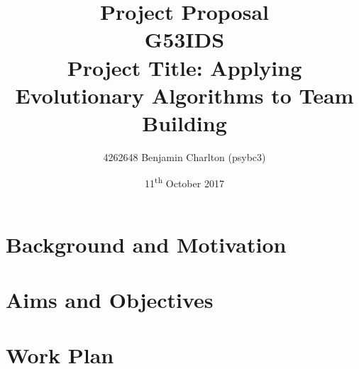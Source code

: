 \documentclass{article}
\title{
    Project Proposal
    \\ \large{G53IDS}
    \\ \large{Project Title: Applying Evolutionary Algorithms to \Pokemon{} Team Building}\vspace{-3ex}}
\author{4262648 Benjamin Charlton (psybc3)}
\date{\vspace{-2ex}11\textsuperscript{th} October 2017}
\begin{document}
\maketitle

\section{Background and Motivation}
\lipsum[1]

\section{Aims and Objectives}
\lipsum[1]

\section{Work Plan}
\lipsum[1]

\nocite{bar}


\end{document}
